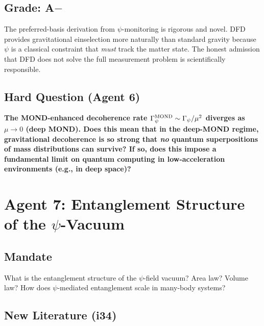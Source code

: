 \documentclass[11pt,a4paper]{article}
\begin{document}
\subsection{Grade: A$-$}

The preferred-basis derivation from $\psi$-monitoring is rigorous and novel. DFD provides gravitational einselection more naturally than standard gravity because $\psi$ is a classical constraint that \emph{must} track the matter state. The honest admission that DFD does not solve the full measurement problem is scientifically responsible.

\subsection{Hard Question (Agent 6)}

\textbf{The MOND-enhanced decoherence rate $\Gamma_\psi^{\rm MOND} \sim \Gamma_\psi/\mu^2$ diverges as $\mu \to 0$ (deep MOND). Does this mean that in the deep-MOND regime, gravitational decoherence is so strong that \emph{no} quantum superpositions of mass distributions can survive? If so, does this impose a fundamental limit on quantum computing in low-acceleration environments (e.g., in deep space)?}

\newpage

\section{Agent 7: Entanglement Structure of the $\psi$-Vacuum}
\label{sec:agent7}

\subsection{Mandate}

What is the entanglement structure of the $\psi$-field vacuum? Area law? Volume law? How does $\psi$-mediated entanglement scale in many-body systems?

\subsection{New Literature (i34)}
\end{document}
